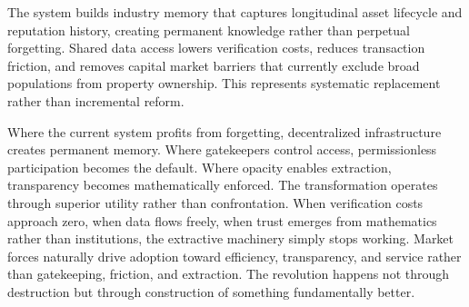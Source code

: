 The system builds industry memory that captures longitudinal asset lifecycle and reputation history, creating permanent knowledge rather than perpetual forgetting. Shared data access lowers verification costs, reduces transaction friction, and removes capital market barriers that currently exclude broad populations from property ownership. This represents systematic replacement rather than incremental reform.

Where the current system profits from forgetting, decentralized infrastructure creates permanent memory. Where gatekeepers control access, permissionless participation becomes the default. Where opacity enables extraction, transparency becomes mathematically enforced. The transformation operates through superior utility rather than confrontation. When verification costs approach zero, when data flows freely, when trust emerges from mathematics rather than institutions, the extractive machinery simply stops working. Market forces naturally drive adoption toward efficiency, transparency, and service rather than gatekeeping, friction, and extraction. The revolution happens not through destruction but through construction of something fundamentally better.